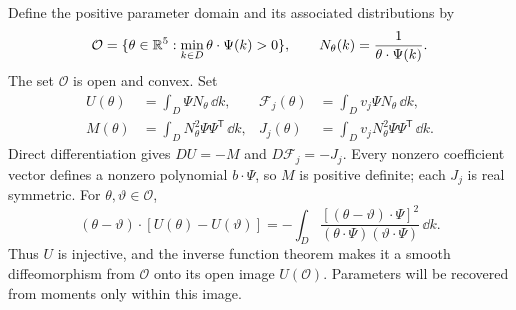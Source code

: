 Define the positive parameter domain and its associated distributions by
\begin{equation}\label{hyd:thermodomain}
 \mathcal O=\{\theta\in\mathbb R^5:\min_{k\in D}\theta\cdot\Psi(k)>0\},
 \qquad N_\theta(k)=\frac1{\theta\cdot\Psi(k)}.
\end{equation}
The set $\mathcal O$ is open and convex. Set
\begin{align}
 U(\theta)&=\int_D\Psi N_\theta\,\dd k,
 &\mathcal F_j(\theta)&=\int_Dv_j\Psi N_\theta\,\dd k,
 \label{hyd:moment-map}\\
 M(\theta)&=\int_DN_\theta^2\Psi\Psi^{\mathsf T}\,\dd k,
 &J_j(\theta)&=\int_Dv_jN_\theta^2\Psi\Psi^{\mathsf T}\,\dd k.
 \label{hyd:matrices}
\end{align}
Direct differentiation gives $DU=-M$ and $D\mathcal F_j=-J_j$.
Every nonzero coefficient vector defines a nonzero polynomial
$b\cdot\Psi$, so $M$ is positive definite; each $J_j$ is real symmetric.
For $\theta,\vartheta\in\mathcal O$,
\begin{equation}\label{hyd:moment-injective}
 (\theta-\vartheta)\cdot[U(\theta)-U(\vartheta)]
 =-\int_D\frac{[(\theta-\vartheta)\cdot\Psi]^2}
 {(\theta\cdot\Psi)(\vartheta\cdot\Psi)}\,\dd k.
\end{equation}
Thus $U$ is injective, and the inverse function theorem makes it a smooth
diffeomorphism from $\mathcal O$ onto its open image $U(\mathcal O)$.
Parameters will be recovered from moments only within this image.

